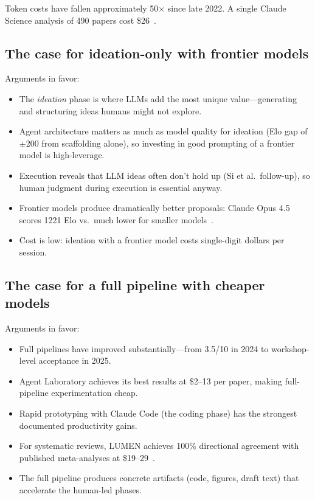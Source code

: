 \documentclass[11pt,a4paper]{article}
\begin{document}
Token costs have fallen approximately 50$\times$ since late 2022. A single Claude Science analysis of 490 papers cost \$26~\cite{drakeforbes2026}.

\subsection{The case for ideation-only with frontier models}

Arguments in favor:
\begin{itemize}
\item The \emph{ideation} phase is where LLMs add the most unique value---generating and structuring ideas humans might not explore.
\item Agent architecture matters as much as model quality for ideation (Elo gap of $\pm$200 from scaffolding alone), so investing in good prompting of a frontier model is high-leverage.
\item Execution reveals that LLM ideas often don't hold up (Si et al.\ follow-up), so human judgment during execution is essential anyway.
\item Frontier models produce dramatically better proposals: Claude Opus 4.5 scores 1221 Elo vs.\ much lower for smaller models~\cite{ideationarena2026}.
\item Cost is low: ideation with a frontier model costs single-digit dollars per session.
\end{itemize}

\subsection{The case for a full pipeline with cheaper models}

Arguments in favor:
\begin{itemize}
\item Full pipelines have improved substantially---from 3.5/10 in 2024 to workshop-level acceptance in 2025.
\item Agent Laboratory achieves its best results at \$2--13 per paper, making full-pipeline experimentation cheap.
\item Rapid prototyping with Claude Code (the coding phase) has the strongest documented productivity gains.
\item For systematic reviews, LUMEN achieves 100\% directional agreement with published meta-analyses at \$19--29~\cite{lumen2026}.
\item The full pipeline produces concrete artifacts (code, figures, draft text) that accelerate the human-led phases.
\end{itemize}
\end{document}
